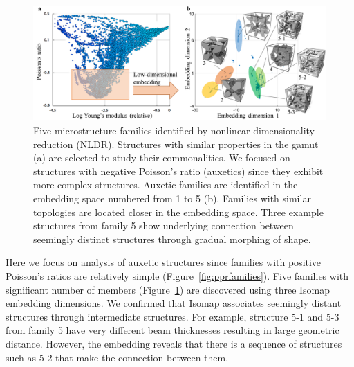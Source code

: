 \begin{figure}
\includegraphics[width=\columnwidth]{images/fiveFamilies.png}
\caption{Five microstructure families identified by nonlinear dimensionality reduction (NLDR). Structures with similar properties in the gamut (a) are selected to study their commonalities. We focused on structures with negative Poisson's ratio (auxetics) since they exhibit more complex structures. Auxetic families are identified in the embedding space numbered from 1 to 5 (b). Families with similar topologies are located closer in the embedding space. Three example structures from family 5 show underlying connection between seemingly distinct structures through gradual morphing of shape.}
\label{fig:families}
\end{figure}
Here we focus on analysis of auxetic structures since families with positive Poisson's ratios are relatively simple (Figure~\ref{fig:pprfamilies}). Five families with significant number of members (Figure~\ref{fig:families}) are discovered using three Isomap embedding dimensions. We confirmed that Isomap associates seemingly distant structures through intermediate structures. For example, structure 5-1 and 5-3 from family 5 have very different beam thicknesses resulting in large geometric distance. However, the embedding reveals that there is a sequence of structures such as 5-2 that make the connection between them.
